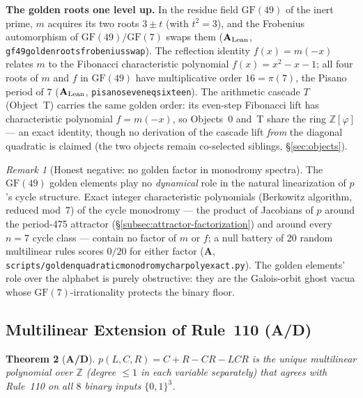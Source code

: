 \documentclass[11pt]{article}
\newtheorem{theorem}{Theorem}[section]
\theoremstyle{remark}
\newtheorem{remark}[theorem]{Remark}
\newcommand{\GF}[1]{\ensuremath{\mathrm{GF}(#1)}}
\newcommand{\lean}[1]{%
  \penalty-100
  \begingroup\def\_{\textunderscore\allowbreak}\texttt{#1}\endgroup}
\newcommand{\CatA}{\textbf{A}}
\newcommand{\CatAL}{\texorpdfstring{\ensuremath{\textbf{A}_{\rm Lean}}}{A-Lean}}
\newcommand{\CatAD}{\textbf{A/D}}
\begin{document}
\medskip
\noindent\textbf{The golden roots one level up.}
In the residue field $\GF{49}$ of the inert prime, $m$ acquires its two
roots $3 \pm t$ (with $t^2 = 3$), and the Frobenius automorphism of
$\GF{49}/\GF{7}$ swaps them (\CatAL{},
\lean{gf49\_golden\_roots\_frobenius\_swap}). The reflection identity
$f(x) = m(-x)$ relates $m$ to the Fibonacci characteristic polynomial
$f(x) = x^2 - x - 1$; all four roots of $m$ and $f$ in $\GF{49}$ have
multiplicative order $16 = \pi(7)$, the Pisano period of $7$ (\CatAL{},
\lean{pisano\_seven\_eq\_sixteen}). The arithmetic cascade $T$ (Object~T)
carries the same golden order: its even-step Fibonacci lift has
characteristic polynomial $f = m(-x)$, so Objects~0 and~T share the ring
$\mathbb{Z}[\varphi]$ --- an exact identity, though no derivation of the
cascade lift \emph{from} the diagonal quadratic is claimed (the two objects
remain co-selected siblings, §\ref{sec:objects}).

\begin{remark}[Honest negative: no golden factor in monodromy spectra]
\label{rem:monodromy-null}
The $\GF{49}$ golden elements play no \emph{dynamical} role in the natural
linearization of $p$'s cycle structure. Exact integer characteristic
polynomials (Berkowitz algorithm, reduced mod~$7$) of the cycle monodromy
--- the product of Jacobians of $p$ around the period-475 attractor
(§\ref{subsec:attractor-factorization}) and around every $n=7$ cycle class
--- contain no factor of $m$ or $f$; a null battery of 20 random multilinear
rules scores $0/20$ for either factor
(\CatA{}, \lean{scripts/golden\_quadratic\_monodromy\_charpoly\_exact.py}).
The golden elements' role over the alphabet is purely obstructive: they are
the Galois-orbit ghost vacua whose $\GF{7}$-irrationality protects the
binary floor.
\end{remark}

\subsection{Multilinear Extension of Rule~110 (\CatAD{})}

\begin{theorem}[\CatAD{}]
\label{thm:multilinear}
$p(L,C,R) = C+R-CR-LCR$ is the unique multilinear polynomial over $\mathbb{Z}$
(degree ${\leq}1$ in each variable separately) that agrees with Rule~110 on all
$8$ binary inputs $\{0,1\}^3$.
\end{theorem}
\end{document}
